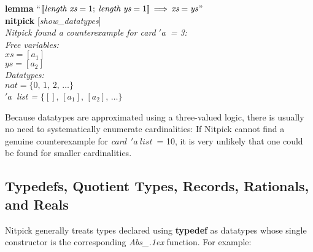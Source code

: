 \documentclass[a4paper,12pt]{article}
\def\unr{\ldots}
\begin{document}
\prew
\textbf{lemma} ``$\mathopen{[\![} \textit{length}~\textit{xs} = 1;\> \textit{length}~\textit{ys} = 1
\mathclose{]\!]} \,\Longrightarrow\, \textit{xs} = \textit{ys}$''
\\
\textbf{nitpick} [\textit{show\_datatypes}] \\[2\smallskipamount]
\slshape Nitpick found a counterexample for \textit{card} $'a$~= 3: \\[2\smallskipamount]
\hbox{}\qquad Free variables: \nopagebreak \\
\hbox{}\qquad\qquad $\textit{xs} = [a_1]$ \\
\hbox{}\qquad\qquad $\textit{ys} = [a_2]$ \\
\hbox{}\qquad Datatypes: \\
\hbox{}\qquad\qquad $\textit{nat} = \{0,\, 1,\, 2,\, \unr\}$ \\
\hbox{}\qquad\qquad $'a$~\textit{list} = $\{[],\, [a_1],\, [a_2],\, \unr\}$
\postw

Because datatypes are approximated using a three-valued logic, there is usually
no need to systematically enumerate cardinalities: If Nitpick cannot find a
genuine counterexample for \textit{card}~$'a~\textit{list}$~= 10, it is very
unlikely that one could be found for smaller cardinalities.

\subsection{Typedefs, Quotient Types, Records, Rationals, and Reals}
\label{typedefs-quotient-types-records-rationals-and-reals}

Nitpick generally treats types declared using \textbf{typedef} as datatypes
whose single constructor is the corresponding \textit{Abs\_\kern.1ex} function.
For example:
\end{document}
